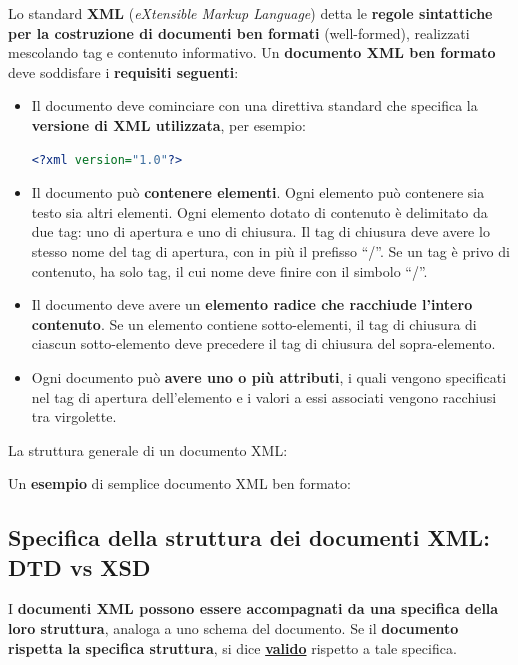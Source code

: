 \documentclass[a4paper]{article}
\newcommand{\dquotes}[1]{``#1''}
\begin{document}
	Lo standard \textcolor{Red3}{\textbf{XML}} (\emph{eXtensible Markup Language}) detta le \textbf{regole sintattiche per la costruzione di documenti ben formati} (well-formed), realizzati mescolando tag e contenuto informativo. Un \textbf{documento XML ben formato} deve soddisfare i \textbf{requisiti seguenti}:
	\begin{itemize}
		\item Il documento deve cominciare con una direttiva standard che specifica la \textbf{versione di XML utilizzata}, per esempio:
		\begin{lstlisting}[language=XML]
<?xml version="1.0"?>\end{lstlisting}
		
		\item Il documento può \textbf{contenere elementi}. Ogni elemento può contenere sia testo sia altri elementi. Ogni elemento dotato di contenuto è delimitato da due tag: uno di apertura e uno di chiusura. Il tag di chiusura deve avere lo stesso nome del tag di apertura, con in più il prefisso \dquotes{/}. Se un tag è privo di contenuto, ha solo tag, il cui nome deve finire con il simbolo \dquotes{/}.
		
		\item Il documento deve avere un \textbf{elemento radice che racchiude l'intero contenuto}. Se un elemento contiene sotto-elementi, il tag di chiusura di ciascun sotto-elemento deve precedere il tag di chiusura del sopra-elemento.
		
		\item Ogni documento può \textbf{avere uno o più attributi}, i quali vengono specificati nel tag di apertura dell'elemento e i valori a essi associati vengono racchiusi tra virgolette.
	\end{itemize}
	La struttura generale di un documento XML:
	
	Un \textcolor{Green4}{\textbf{esempio}} di semplice documento XML ben formato:
	\newpage
	
	\subsection{Specifica della struttura dei documenti XML: DTD vs XSD}
	
	I \textbf{documenti XML possono essere accompagnati da una specifica della loro struttura}, analoga a uno schema del documento. Se il \textbf{documento rispetta la specifica struttura}, si dice \underline{\textbf{valido}} rispetto a tale specifica.\newline
	
\end{document}
